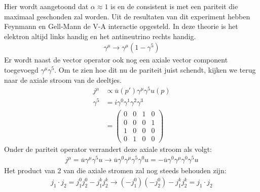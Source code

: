 \documentclass[../main.tex]{subfiles}
\begin{document}
Hier wordt aangetoond dat $\alpha \approx 1$ is en de consistent is met een pariteit die maximaal geschonden zal worden. Uit de resultaten van dit experiment hebben Feynmann en Gell-Mann de V-A interactie opgesteld. In deze theorie is het elektron altijd links handig en het antineutrino rechts handig.
\begin{equation}
    \begin{aligned}
        \label{eq:v-a_theorie}
        \gamma^\mu \rightarrow \gamma^\mu (1-\gamma^5)
    \end{aligned}
\end{equation}
Er wordt naast de vector operator ook nog een axiale vector component toegevoegd $\gamma^\mu \gamma^5$. Om te zien hoe dit nu de pariteit juist schendt, kijken we terug naar de axiale stroom van de deeltjes.
\begin{equation}
    \begin{aligned}
        \label{eq:axiale_stroom_v-a}
        j^\mu &\propto \overline u(p')\gamma^\mu\gamma^5u(p)\\
        \gamma^5 &= i\gamma^0\gamma^1\gamma^2\gamma^3\\
                 &=
                 \begin{pmatrix}
                      0&0&1&0\\
                      0&0&0&1\\
                      1&0&0&0\\
                      0&1&0&0
                 \end{pmatrix}
    \end{aligned}
\end{equation}
Onder de pariteit operator verrandert deze axiale stroom als volgt:
\begin{equation}
    \begin{aligned}
        \label{eq:axiale_stroom_v-a_par}
        j^\mu = \overline u\gamma^\mu\gamma^5u \rightarrow \overline u\gamma^0\gamma^\mu\gamma^5\gamma^0u = -\overline u\gamma^0\gamma^\mu\gamma^0\gamma^5u
    \end{aligned}
\end{equation}
Het product van 2 van die axiale stromen zal nog steeds behouden zijn:
\begin{equation}
    \begin{aligned}
        \label{eq:axiale_stroom_v-a_prod}
        j_1\cdot j_2 = j_1^0j_2^0 - j_1^kj_2^k \rightarrow (-j_1^0)(-j_2^0) - j_1^kj_2^k = j_1\cdot j_2
    \end{aligned}
\end{equation}
\end{document}
